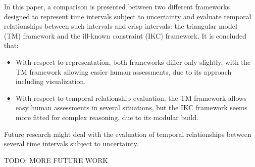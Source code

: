 In this paper, a comparison is presented between two different frameworks designed to represent time intervals subject to uncertainty and evaluate temporal relationships between such intervals and crisp intervals: the triangular model (TM) framework and the ill-known constraint (IKC) framework. It is concluded that:

\begin{itemize}
	\item With respect to representation, both frameworks differ only slightly, with the TM framework allowing easier human assessments, due to its approach including visualization.
	\item With respect to temporal relationship evaluation, the TM framework allows easy human assessments in several situations, but the IKC framework seems more fitted for complex reasoning, due to its modular build.
\end{itemize}

Future research might deal with the evaluation of temporal relationships between several time intervals subject to uncertainty.

TODO: MORE FUTURE WORK



